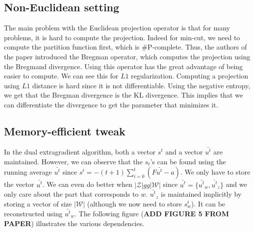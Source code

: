 \subsection{Non-Euclidean setting}
The main problem with the Euclidean projection operator is that for many
problems, it is hard to compute the projection. Indeed for min-cut, we need to
compute the partition function first, which is \#P-complete. Thus, the authors
of the paper introduced the Bregman operator, which computes the projection
using the Bregmand divergence. Using this operator has the great advantage of
being easier to compute. We can see this for $L1$ regularization. Computing a
projection using $L1$ distance is hard since it is not differentiable. Using the
negative entropy, we get that the Bregman divergence is the KL divergence. This
implies that we can differentiate the divergence to get the parameter that
minimizes it.

\subsection{Memory-efficient tweak}
In the dual extragradient algorithm, both a vector $s^t$ and a vector
$\bar{u^t}$ are maintained. However, we can observe that the $s_t$'s can be
found using the running average $\bar{u^t}$ since $s^t = -(t + 1 ) \sum_{i=0}^t
(F \bar{u^t} - a)$. We only have to store the vector $\bar{u^t}$. We can even do
better when $|\mathcal{Z}| gg |\mathcal{W}|$ since $\bar{u^t} = \{
\bar{u^t}_w,\bar{u^t}_z \}$ and we only care about the part that corresponds to
$w$. $\bar{u^t}_z$ is maintained implicitly by storing a vector of size
$|\mathcal{W}|$ (although we now need to store $s_w^t$). It can be reconstructed
using $\bar{u^t}_w$. The following figure (\textbf{ADD FIGURE 5 FROM PAPER})
illustrates the various dependencies.




